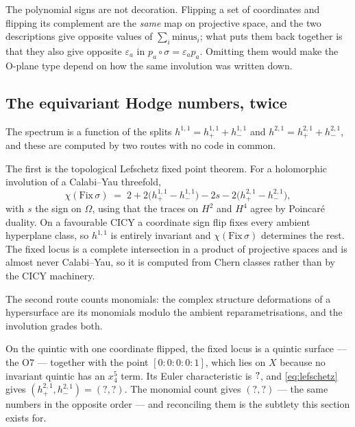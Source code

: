 \documentclass[11pt,a4paper]{article}
\newcommand{\SFQuinticHtwoPlus}{?}\newcommand{\SFQuinticHtwoMinus}{?}
\newcommand{\SFQuinticDefPlus}{?}\newcommand{\SFQuinticDefMinus}{?}
\theoremstyle{definition}
\begin{document}
The polynomial signs are not decoration. Flipping a set of coordinates and
flipping its complement are the \emph{same} map on projective space, and the
two descriptions give opposite values of $\sum_i \mathrm{minus}_i$; what puts
them back together is that they also give opposite $\varepsilon_a$ in
$p_a \circ \sigma = \varepsilon_a p_a$. Omitting them would make the O-plane
type depend on how the same involution was written down.

\subsection{The equivariant Hodge numbers, twice}
\label{sec:hodgesplit}

The spectrum is a function of the splits
$h^{1,1} = h^{1,1}_+ + h^{1,1}_-$ and $h^{2,1} = h^{2,1}_+ + h^{2,1}_-$, and
these are computed by two routes with no code in common.

The first is the topological Lefschetz fixed point theorem. For a holomorphic
involution of a Calabi--Yau threefold,
%
\begin{equation}
\chi(\mathrm{Fix}\,\sigma) \;=\;
2 + 2\bigl(h^{1,1}_+ - h^{1,1}_-\bigr) - 2 s
- 2 \bigl(h^{2,1}_+ - h^{2,1}_-\bigr) ,
\label{eq:lefschetz}
\end{equation}
%
with $s$ the sign on $\Omega$, using that the traces on $H^2$ and $H^4$ agree
by Poincar\'e duality. On a favourable CICY a coordinate sign flip fixes every
ambient hyperplane class, so $h^{1,1}$ is entirely invariant and
$\chi(\mathrm{Fix}\,\sigma)$ determines the rest. The fixed locus is a
complete intersection in a product of projective spaces and is almost never
Calabi--Yau, so it is computed from Chern classes rather than by the CICY
machinery.

The second route counts monomials: the complex structure deformations of a
hypersurface are its monomials modulo the ambient reparametrisations, and the
involution grades both.

On the quintic with one coordinate flipped, the fixed locus is a quintic
surface --- the O7 --- together with the point $[0{:}0{:}0{:}0{:}1]$, which
lies on $X$ because no invariant quintic has an $x_4^5$ term. Its Euler
characteristic is $?$, and \cref{eq:lefschetz} gives
$(h^{2,1}_+, h^{2,1}_-) = (\SFQuinticHtwoPlus, \SFQuinticHtwoMinus)$. The
monomial count gives $(\SFQuinticDefPlus, \SFQuinticDefMinus)$ --- the same
numbers in the opposite order --- and reconciling them is the subtlety this
section exists for.
\end{document}
